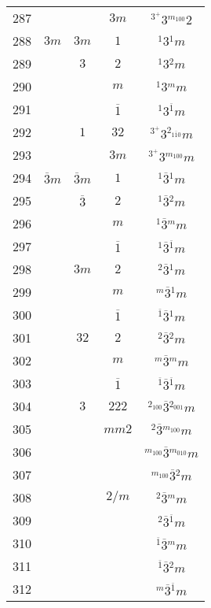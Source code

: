 \begin{longtable}{ccccc}
  287 &  &  & $3m$ & ${}^{3^{+}} 3 {}^{m_{100}} 2 $\\
  288 & $3m$ & $3m$ & $1$ & ${}^{1} 3 {}^{1} m $\\
  289 &  & $3$ & $2$ & ${}^{1} 3 {}^{2} m $\\
  290 &  &  & $m$ & ${}^{1} 3 {}^{m} m $\\
  291 &  &  & $\overline{1}$ & ${}^{1} 3 {}^{\overline{1}} m $\\
  292 &  & $1$ & $32$ & ${}^{3^{+}} 3 {}^{2_{1\overline{1}0}} m $\\
  293 &  &  & $3m$ & ${}^{3^{+}} 3 {}^{m_{100}} m $\\
  294 & $\overline{3}m$ & $\overline{3}m$ & $1$ & ${}^{1} \overline{3} {}^{1} m $\\
  295 &  & $\overline{3}$ & $2$ & ${}^{1} \overline{3} {}^{2} m $\\
  296 &  &  & $m$ & ${}^{1} \overline{3} {}^{m} m $\\
  297 &  &  & $\overline{1}$ & ${}^{1} \overline{3} {}^{\overline{1}} m $\\
  298 &  & $3m$ & $2$ & ${}^{2} \overline{3} {}^{1} m $\\
  299 &  &  & $m$ & ${}^{m} \overline{3} {}^{1} m $\\
  300 &  &  & $\overline{1}$ & ${}^{\overline{1}} \overline{3} {}^{1} m $\\
  301 &  & $32$ & $2$ & ${}^{2} \overline{3} {}^{2} m $\\
  302 &  &  & $m$ & ${}^{m} \overline{3} {}^{m} m $\\
  303 &  &  & $\overline{1}$ & ${}^{\overline{1}} \overline{3} {}^{\overline{1}} m $\\
  304 &  & $3$ & $222$ & ${}^{2_{100}} \overline{3} {}^{2_{001}} m $\\
  305 &  &  & $mm2$ & ${}^{2} \overline{3} {}^{m_{100}} m $\\
  306 &  &  &  & ${}^{m_{100}} \overline{3} {}^{m_{010}} m $\\
  307 &  &  &  & ${}^{m_{100}} \overline{3} {}^{2} m $\\
  308 &  &  & $2/m$ & ${}^{2} \overline{3} {}^{m} m $\\
  309 &  &  &  & ${}^{2} \overline{3} {}^{\overline{1}} m $\\
  310 &  &  &  & ${}^{\overline{1}} \overline{3} {}^{m} m $\\
  311 &  &  &  & ${}^{\overline{1}} \overline{3} {}^{2} m $\\
  312 &  &  &  & ${}^{m} \overline{3} {}^{\overline{1}} m $\\

\end{longtable}
